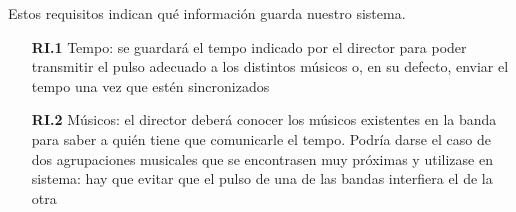 Estos requisitos indican qué información guarda nuestro sistema.\\

  \begin{itemize}
    \item[\textbf{RI.1}] Tempo: se guardará el tempo indicado por el director
    para poder transmitir el pulso adecuado a los distintos músicos o, en su defecto,
    enviar el tempo una vez que estén sincronizados
    \item[\textbf{RI.2}] Músicos: el director deberá conocer los músicos existentes en la banda
    para saber a quién tiene que comunicarle el tempo. Podría darse el caso de dos
    agrupaciones musicales que se encontrasen muy próximas y utilizase en sistema:
    hay que evitar que el pulso de una de las bandas interfiera el de la otra
  \end{itemize}
